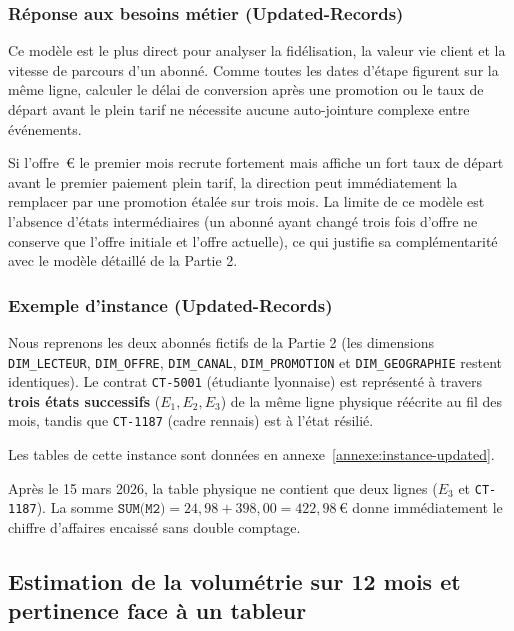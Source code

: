 \documentclass[a4paper,12pt]{article}
\begin{document}
\subsubsection*{Réponse aux besoins métier (Updated-Records)}

Ce modèle est le plus direct pour analyser la fidélisation, la valeur vie client et la vitesse de parcours d'un abonné. Comme toutes les dates d'étape figurent sur la même ligne, calculer le délai de conversion après une promotion ou le taux de départ avant le plein tarif ne nécessite aucune auto-jointure complexe entre événements.

\bigskip

Si l'offre \,€ le premier mois \fg{} recrute fortement mais affiche un fort taux de départ avant le premier paiement plein tarif, la direction peut immédiatement la remplacer par une promotion étalée sur trois mois. La limite de ce modèle est l'absence d'états intermédiaires (un abonné ayant changé trois fois d'offre ne conserve que l'offre initiale et l'offre actuelle), ce qui justifie sa complémentarité avec le modèle détaillé de la Partie 2.

\subsubsection*{Exemple d'instance (Updated-Records)}

Nous reprenons les deux abonnés fictifs de la Partie 2 (les dimensions \texttt{DIM\_LECTEUR}, \texttt{DIM\_OFFRE}, \texttt{DIM\_CANAL}, \texttt{DIM\_PROMOTION} et \texttt{DIM\_GEOGRAPHIE} restent identiques). Le contrat \texttt{CT-5001} (étudiante lyonnaise) est représenté à travers \textbf{trois états successifs} ($E_1, E_2, E_3$) de la même ligne physique réécrite au fil des mois, tandis que \texttt{CT-1187} (cadre rennais) est à l'état résilié.

Les tables de cette instance sont données en
annexe~\ref{annexe:instance-updated}.

Après le 15 mars 2026, la table physique ne contient que deux lignes ($E_3$ et \texttt{CT-1187}). La somme $\texttt{SUM(M2)} = 24{,}98 + 398{,}00 = 422{,}98\,\text{€}$ donne immédiatement le chiffre d'affaires encaissé sans double comptage.



\subsection{Estimation de la volumétrie sur 12 mois et pertinence face à un tableur}
\end{document}
